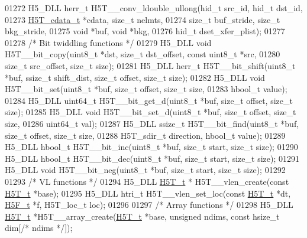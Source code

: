 \begin{DoxyCode}
01272 H5\_DLL herr\_t H5T\_\_conv\_ldouble\_ullong(hid\_t src\_id, hid\_t dst\_id,
01273                      \hyperlink{struct_h5_t__cdata__t}{H5T\_cdata\_t} *cdata, \textcolor{keywordtype}{size\_t} nelmts,
01274                      \textcolor{keywordtype}{size\_t} buf\_stride, \textcolor{keywordtype}{size\_t} bkg\_stride,
01275                                      \textcolor{keywordtype}{void} *buf, \textcolor{keywordtype}{void} *bkg,
01276                                      hid\_t dset\_xfer\_plist);
01277 
01278 \textcolor{comment}{/* Bit twiddling functions */}
01279 H5\_DLL \textcolor{keywordtype}{void} H5T\_\_bit\_copy(uint8\_t *dst, \textcolor{keywordtype}{size\_t} dst\_offset, \textcolor{keyword}{const} uint8\_t *src,
01280               \textcolor{keywordtype}{size\_t} src\_offset, \textcolor{keywordtype}{size\_t} size);
01281 H5\_DLL herr\_t H5T\_\_bit\_shift(uint8\_t *buf, ssize\_t shift\_dist, \textcolor{keywordtype}{size\_t} offset, \textcolor{keywordtype}{size\_t} size);
01282 H5\_DLL \textcolor{keywordtype}{void} H5T\_\_bit\_set(uint8\_t *buf, \textcolor{keywordtype}{size\_t} offset, \textcolor{keywordtype}{size\_t} size,
01283              hbool\_t value);
01284 H5\_DLL uint64\_t H5T\_\_bit\_get\_d(uint8\_t *buf, \textcolor{keywordtype}{size\_t} offset, \textcolor{keywordtype}{size\_t} size);
01285 H5\_DLL \textcolor{keywordtype}{void} H5T\_\_bit\_set\_d(uint8\_t *buf, \textcolor{keywordtype}{size\_t} offset, \textcolor{keywordtype}{size\_t} size,
01286                uint64\_t val);
01287 H5\_DLL ssize\_t H5T\_\_bit\_find(uint8\_t *buf, \textcolor{keywordtype}{size\_t} offset, \textcolor{keywordtype}{size\_t} size,
01288                  H5T\_sdir\_t direction, hbool\_t value);
01289 H5\_DLL hbool\_t H5T\_\_bit\_inc(uint8\_t *buf, \textcolor{keywordtype}{size\_t} start, \textcolor{keywordtype}{size\_t} size);
01290 H5\_DLL hbool\_t H5T\_\_bit\_dec(uint8\_t *buf, \textcolor{keywordtype}{size\_t} start, \textcolor{keywordtype}{size\_t} size);
01291 H5\_DLL \textcolor{keywordtype}{void} H5T\_\_bit\_neg(uint8\_t *buf, \textcolor{keywordtype}{size\_t} start, \textcolor{keywordtype}{size\_t} size);
01292 
01293 \textcolor{comment}{/* VL functions */}
01294 H5\_DLL \hyperlink{struct_h5_t__t}{H5T\_t} * H5T\_\_vlen\_create(\textcolor{keyword}{const} \hyperlink{struct_h5_t__t}{H5T\_t} *base);
01295 H5\_DLL htri\_t H5T\_\_vlen\_set\_loc(\textcolor{keyword}{const} \hyperlink{struct_h5_t__t}{H5T\_t} *dt, \hyperlink{struct_h5_f__t}{H5F\_t} *f, H5T\_loc\_t loc);
01296 
01297 \textcolor{comment}{/* Array functions */}
01298 H5\_DLL \hyperlink{struct_h5_t__t}{H5T\_t} *H5T\_\_array\_create(\hyperlink{struct_h5_t__t}{H5T\_t} *base, \textcolor{keywordtype}{unsigned} ndims, \textcolor{keyword}{const} hsize\_t dim[\textcolor{comment}{/* ndims */}]);

\end{DoxyCode}
